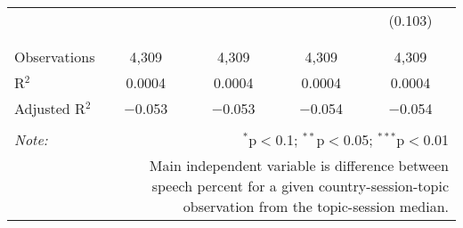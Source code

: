 \begin{table}[!htbp]
\begin{tabular}{@{\extracolsep{5pt}}lcccc}
  &  &  &  & (0.103) \\ 
  & & & & \\ 
\hline \\[-1.8ex] 
Observations & 4,309 & 4,309 & 4,309 & 4,309 \\ 
R$^{2}$ & 0.0004 & 0.0004 & 0.0004 & 0.0004 \\ 
Adjusted R$^{2}$ & $-$0.053 & $-$0.053 & $-$0.054 & $-$0.054 \\ 
\hline 
\hline \\[-1.8ex] 
\textit{Note:}  & \multicolumn{4}{r}{$^{*}$p$<$0.1; $^{**}$p$<$0.05; $^{***}$p$<$0.01} \\ 
 & \multicolumn{4}{r}{Main independent variable is difference between speech percent for a given country-session-topic observation from the topic-session median.} \\ 
\end{tabular} 
\end{table} 
